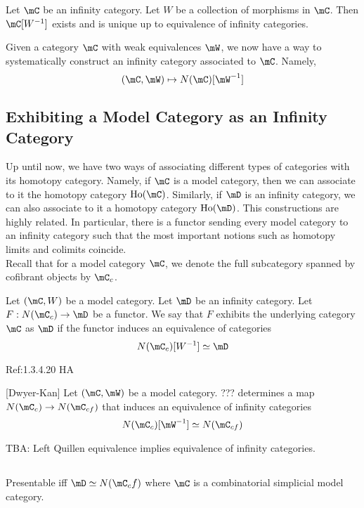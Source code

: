 \documentclass[a4paper]{article}
\begin{document}
\begin{prp}{}{} Let $\mC$ be an infinity category. Let $W$ be a collection of morphisms in $\mC$. Then $\mC[W^{-1}]$ exists and is unique up to equivalence of infinity categories. 
\end{prp}

Given a category $\mC$ with weak equivalences $\mW$, we now have a way to systematically construct an infinity category associated to $\mC$. Namely, $$(\mC,\mW)\mapsto N(\mC)[\mW^{-1}]$$

\subsection{Exhibiting a Model Category as an Infinity Category}
Up until now, we have two ways of associating different types of categories with its homotopy category. Namely, if $\mC$ is a model category, then we can associate to it the homotopy category $\text{Ho}(\mC)$. Similarly, if $\mD$ is an infinity category, we can also associate to it a homotopy category $\text{Ho}(\mD)$. This constructions are highly related. In particular, there is a functor sending every model category to an infinity category such that the most important notions such as homotopy limits and colimits coincide. \\

Recall that for a model category $\mC$, we denote the full subcategory spanned by cofibrant objects by $\mC_c$. 

\begin{defn}{}{} Let $(\mC,W)$ be a model category. Let $\mD$ be an infinity category. Let $F:N(\mC_c)\to\mD$ be a functor. We say that $F$ exhibits the underlying category $\mC$ as $\mD$ if the functor induces an equivalence of categories $$N(\mC_c)[W^{-1}]\simeq\mD$$
\end{defn}

Ref:1.3.4.20 HA

\begin{thm}{[Dwyer-Kan]}{} Let $(\mC,\mW)$ be a model category. ??? determines a map $N(\mC_c)\to N(\mC_{cf})$ that induces an equivalence of infinity categories $$N(\mC_c)[\mW^{-1}]\simeq N(\mC_{cf})$$
\end{thm}

TBA: Left Quillen equivalence implies equivalence of infinity categories. 

\subsection{}
Presentable iff $\mD\simeq N(\mC_cf)$ where $\mC$ is a combinatorial simplicial model category. 
\end{document}
